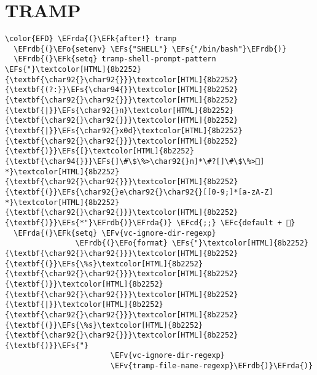 \documentclass[12pt]{article}
\theoremstyle{plain}%
\theoremstyle{definition}
\theoremstyle{remark}
\newcommand{\EFc}[1]{\textcolor{EFc}{#1}} %
\newcommand{\EFcd}[1]{\textcolor{EFcd}{#1}} %
\newcommand{\EFs}[1]{\textcolor{EFs}{#1}} %
\newcommand{\EFk}[1]{\textcolor{EFk}{#1}} %
\newcommand{\EFv}[1]{\textcolor{EFv}{#1}} %
\newcommand{\EFo}[1]{\textcolor{EFo}{#1}} %
\newcommand{\EFrda}[1]{\textcolor{EFrda}{#1}} %
\newcommand{\EFrdb}[1]{\textcolor{EFrdb}{#1}} %
\begin{document}
\section{TRAMP}
\label{sec:orgf888538}
\begin{Code}
\begin{Verbatim}
\color{EFD} \EFrda{(}\EFk{after!} tramp
  \EFrdb{(}\EFo{setenv} \EFs{"SHELL"} \EFs{"/bin/bash"}\EFrdb{)}
  \EFrdb{(}\EFk{setq} tramp-shell-prompt-pattern \EFs{"}\textcolor[HTML]{8b2252}{\textbf{\char92{}\char92{}}}\textcolor[HTML]{8b2252}{\textbf{(?:}}\EFs{\char94{}}\textcolor[HTML]{8b2252}{\textbf{\char92{}\char92{}}}\textcolor[HTML]{8b2252}{\textbf{|}}\EFs{\char92{}n}\textcolor[HTML]{8b2252}{\textbf{\char92{}\char92{}}}\textcolor[HTML]{8b2252}{\textbf{|}}\EFs{\char92{}x0d}\textcolor[HTML]{8b2252}{\textbf{\char92{}\char92{}}}\textcolor[HTML]{8b2252}{\textbf{)}}\EFs{[}\textcolor[HTML]{8b2252}{\textbf{\char94{}}}\EFs{]\#\$\%>\char92{}n]*\#?[]\#\$\%>] *}\textcolor[HTML]{8b2252}{\textbf{\char92{}\char92{}}}\textcolor[HTML]{8b2252}{\textbf{(}}\EFs{\char92{}e\char92{}\char92{}[[0-9;]*[a-zA-Z] *}\textcolor[HTML]{8b2252}{\textbf{\char92{}\char92{}}}\textcolor[HTML]{8b2252}{\textbf{)}}\EFs{*"}\EFrdb{)}\EFrda{)} \EFcd{;;} \EFc{default + }
  \EFrda{(}\EFk{setq} \EFv{vc-ignore-dir-regexp}
                \EFrdb{(}\EFo{format} \EFs{"}\textcolor[HTML]{8b2252}{\textbf{\char92{}\char92{}}}\textcolor[HTML]{8b2252}{\textbf{(}}\EFs{\%s}\textcolor[HTML]{8b2252}{\textbf{\char92{}\char92{}}}\textcolor[HTML]{8b2252}{\textbf{)}}\textcolor[HTML]{8b2252}{\textbf{\char92{}\char92{}}}\textcolor[HTML]{8b2252}{\textbf{|}}\textcolor[HTML]{8b2252}{\textbf{\char92{}\char92{}}}\textcolor[HTML]{8b2252}{\textbf{(}}\EFs{\%s}\textcolor[HTML]{8b2252}{\textbf{\char92{}\char92{}}}\textcolor[HTML]{8b2252}{\textbf{)}}\EFs{"}
                        \EFv{vc-ignore-dir-regexp}
                        \EFv{tramp-file-name-regexp}\EFrdb{)}\EFrda{)}
\end{Verbatim}
\end{Code}
\end{document}
